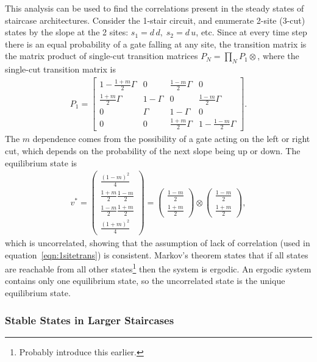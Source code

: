 This analysis can be used to find the correlations present in the steady states of staircase architectures. Consider the 1-stair circuit, and enumerate 2-site (3-cut) states by the slope at the 2 sites: $s_1 = d\,d,\; s_2 = d\,u$, etc. Since at every time step there is an equal probability of a gate falling at any site, the transition matrix is the matrix product of single-cut transition matrices $P_{N} = \prod_NP_{1}\otimes$, where the single-cut transition matrix is 
\begin{align}
P_1 = \begin{bmatrix}
1-\frac{1+m}{2}\Gamma & 0      & \frac{1-m}{2}\Gamma & 0\\
\frac{1+m}{2}\Gamma & 1-\Gamma & 0                   & \frac{1-m}{2}\Gamma\\
0                   & \Gamma   & 1-\Gamma            & 0\\
0                   & 0        & \frac{1+m}{2}\Gamma & 1 - \frac{1-m}{2}\Gamma
\end{bmatrix}. \label{eqn:1sitetrans}
\end{align}
The $m$ dependence comes from the possibility of a gate acting on the left or right cut, which depends on the probability of the next slope being up or down.
The equilibrium state is
\begin{align}
v^* = \begin{pmatrix}
\frac{(1-m)^2}{4} \\ 
\frac{1+m}{2}\frac{1-m}{2} \\
\frac{1-m}{2}\frac{1+m}{2} \\
\frac{(1+m)^2}{4}
\end{pmatrix} = \begin{pmatrix}
\frac{1-m}{2} \\ \frac{1+m}{2}
\end{pmatrix} \otimes \begin{pmatrix}
\frac{1-m}{2} \\ \frac{1+m}{2}
\end{pmatrix},
\end{align}
which is uncorrelated, showing that the assumption of lack of correlation (used in equation~\ref{eqn:1sitetrans}) is consistent. Markov's theorem states that if all states are reachable from all other states\footnote{Probably introduce this earlier.} then the system is ergodic. An ergodic system contains only one equilibrium state, so the uncorrelated state is the unique equilibrium state.

\subsubsection{Stable States in Larger Staircases}  \label{subsub:stairstate}


